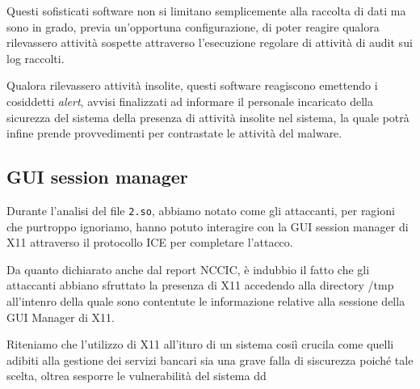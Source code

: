 \documentclass[10pt,a4paper, titlepage]{report}
\begin{document}
Questi sofisticati software non si limitano semplicemente alla raccolta di dati ma sono in grado, previa un'opportuna configurazione, di poter reagire qualora rilevassero attività sospette attraverso l'esecuzione regolare di attività di audit sui log raccolti. 

Qualora rilevassero attività insolite, questi software reagiscono emettendo i cosiddetti \textit{alert}, avvisi finalizzati ad informare il personale incaricato della sicurezza del sistema della presenza di attività insolite nel sistema, la quale potrà infine prende provvedimenti per contrastate le attività del malware.  

\subsection{GUI session manager}

Durante l'analisi del file \texttt{2.so}, abbiamo notato come gli attaccanti, per ragioni che purtroppo ignoriamo, hanno potuto interagire con la GUI session manager di X11 attraverso il protocollo ICE per completare l'attacco.

Da quanto dichiarato anche dal report NCCIC, è indubbio il fatto che gli attaccanti abbiano sfruttato la presenza di X11 accedendo alla directory /tmp all'intenro della quale sono contentute le informazione relative alla sessione della GUI Manager di X11.

Riteniamo che l'utilizzo di X11 all'itnro di un sistema cosiì crucila come quelli adibiti alla gestione dei servizi bancari sia una grave falla di siscurezza poiché tale scelta, oltrea sesporre le vulnerabilità del sistema dd
\end{document}
